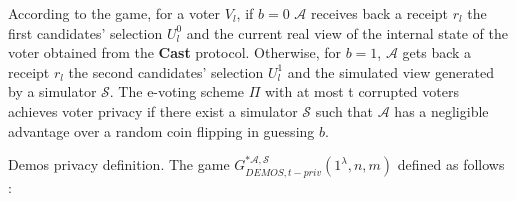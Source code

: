  According to the game, for a voter $V_l$, if $b = 0$ $\mathcal{A}$ receives back a receipt $r_l$ the first candidates' selection $U_l^0$ and the current real view of the internal state of the voter obtained from the \textbf{Cast} protocol. Otherwise, for $b = 1$,  $\mathcal{A}$ gets back a receipt $r_l$ the second candidates' selection $U_l^1$ and the simulated view generated by a simulator $\mathcal{S}$. The e-voting scheme $\Pi$ with at most t corrupted voters achieves voter privacy if there exist a simulator $\mathcal{S}$ such that $\mathcal{A}$  has a negligible advantage over a random coin flipping in guessing $b$.\\
 
\begin{definition}{ Demos privacy definition.}
The game $G_{DEMOS,t-priv}^{*\mathcal{A}, \mathcal{S}}(1^{\lambda},n,m)$ defined as follows \cite{Kiayias2015a}:\\
  

\end{definition}
